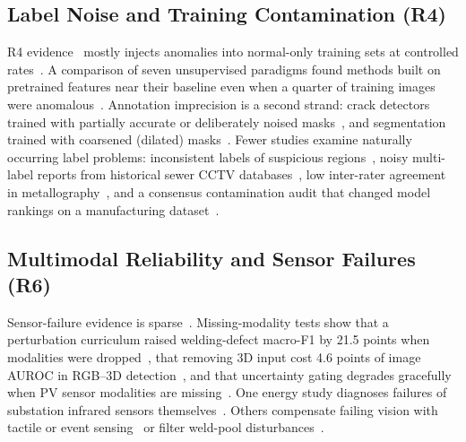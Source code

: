 \documentclass[journal]{IEEEtran}
\begin{document}
\subsection{Label Noise and Training Contamination (R4)}
R4 evidence~\citeFour{} mostly injects anomalies into normal-only training sets at controlled rates~\cite{aqeel2025self,das2025adaptive,wang2025softpatch,tan2021trustmae,moradi2025rddpm,aqeel2025robust,liu2026synergy,zhang2025leveraging,cordier2022data}. A comparison of seven unsupervised paradigms found methods built on pretrained features near their baseline even when a quarter of training images were anomalous~\cite{bozic2025robustness}. Annotation imprecision is a second strand: crack detectors trained with partially accurate or deliberately noised masks~\cite{zhang2021crackgan,rillgarcia2022syncrack}, and segmentation trained with coarsened (dilated) masks~\cite{tabernik2019segmentation}. Fewer studies examine naturally occurring label problems: inconsistent labels of suspicious regions~\cite{niu2024learning}, noisy multi-label reports from historical sewer CCTV databases~\cite{chelouche2025when}, low inter-rater agreement in metallography~\cite{durmaz2023microstructure}, and a consensus contamination audit that changed model rankings on a manufacturing dataset~\cite{szklarzewski2026from}.

\subsection{Multimodal Reliability and Sensor Failures (R6)}
Sensor-failure evidence is sparse~\citeSix. Missing-modality tests show that a perturbation curriculum raised welding-defect macro-F1 by 21.5 points when modalities were dropped~\cite{hoang2026supervised}, that removing 3D input cost 4.6 points of image AUROC in RGB--3D detection~\cite{deng2026maf}, and that uncertainty gating degrades gracefully when PV sensor modalities are missing~\cite{khandagale2026meta}. One energy study diagnoses failures of substation infrared sensors themselves~\cite{hu2025fault}. Others compensate failing vision with tactile or event sensing~\cite{jiang2021vision,shi2026industrial} or filter weld-pool disturbances~\cite{cao2026robust}.
\end{document}
